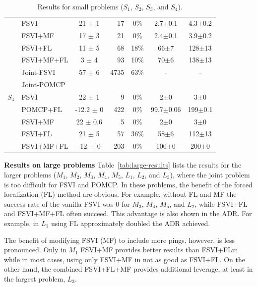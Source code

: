 \documentclass[letterpaper]{article} %
\newcommand{\itay}[1]{}
\begin{document}
\begin{table}
{\begin{tabular}{ |c|l|c|r|c|c|c| }
    & FSVI\itay{+} & 21 $\pm$ 1 & 17 & 0\% & 2.7$\pm$0.1 & 4.3$\pm$0.2 \\
    & FSVI+MF\itay{+} & 17 $\pm$ 3 & 21 & 0\% & 2.4$\pm$0.1 & 3.9$\pm$0.2 \\
    &FSVI+FL\itay{+} & 11 $\pm$ 5 & 68 & 18\% & 66$\pm$7 & 128$\pm$13 \\
    & FSVI+MF+FL\itay{+} & 3 $\pm$ 4 & 93 & 10\% & 70$\pm$6 & 138$\pm$13 \\
    \hline
    \hline
    \multirow{5}{*}{$S_4$}
    & Joint-FSVI\itay{+} & 57 $\pm$ 6 & 4735 & 63\% &  - & - \\
    & Joint-POMCP &&&&& \\
    & FSVI\itay{+} & 22 $\pm$ 1 & 9 & 0\% & 2$\pm$0 & 3$\pm$0 \\
    & POMCP+FL\itay{+} & -12.2 $\pm$ 0 & 422 & 0\% & 99.7$\pm$0.06 & 199$\pm$0.1 \\
    & FSVI+MF\itay{+} & 22 $\pm$ 0.6 & 5 & 0\% &  2$\pm$0 & 3$\pm$0 \\
    &FSVI+FL\itay{+} & 21 $\pm$ 5 & 57 & 36\% & 58$\pm$6 & 112$\pm$13 \\
    & FSVI+MF+FL\itay{+} & -12 $\pm$ 0 & 203 & 0\% &  100$\pm$0 & 200$\pm$0 \\
    \hline
    \hline
     \end{tabular}
     }
    \caption{Results for small problems ($S_1$, $S_2$, $S_3$, and $S_4$).\itay{** Average run-time in 200 runs}}
    \label{tab:2small-results}
\end{table}




\noindent\textbf{Results on large problems}
Table~\ref{tab:large-results} lists the results for the larger problems ($M_1$, $M_2$, $M_3$, $M_4$, $M_5$, $L_1$, $L_2$, and $L_3$), where the joint problem is too difficult for FSVI and POMCP.
In these problems, the benefit of the forced localization (FL) method are obvious.
For example, without FL and MF the success rate of the vanilla FSVI was 0 for $M_3$, $M_4$, $M_5$, and $L_2$, while
FSVI+FL and FSVI+MF+FL often succeed. This advantage is also shown in the ADR.
For example, in $L_1$ using FL approximately doubled the ADR achieved.


The benefit of modifying FSVI (MF) to include more pings, however, is less pronounced. Only in $M_1$ FSVI+MF provides better results than FSVI+FLm while in most cases, using only FSVI+MF in not as good as FSVI+FL. On the other hand, the combined FSVI+FL+MF provides additional leverage, at least in the largest problem, $L_3$.
\end{document}
